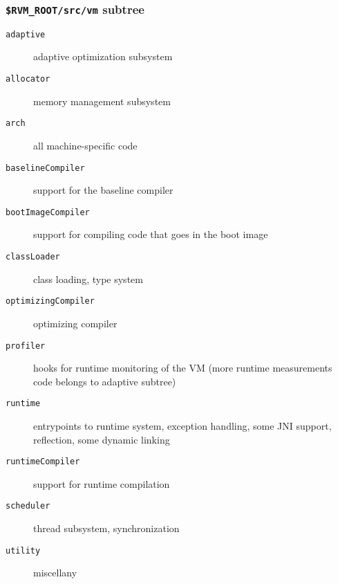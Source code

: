 \subsubsection{{\tt \$RVM\_ROOT/src/vm} subtree}

\begin{description}
\item [{\tt adaptive}] adaptive optimization subsystem
\item [{\tt allocator}] memory management subsystem
\item [{\tt arch}] all machine-specific code
\item [{\tt baselineCompiler}] support for the baseline compiler
\item [{\tt bootImageCompiler}] support for compiling code that goes in the boot image
\item [{\tt classLoader}] class loading, type system
\item [{\tt optimizingCompiler}] optimizing compiler
\item [{\tt profiler}] hooks for runtime monitoring of the VM
(more runtime measurements code belongs to adaptive subtree)
\item [{\tt runtime}] entrypoints to runtime system, exception handling, some JNI support, reflection, some dynamic linking
\item [{\tt runtimeCompiler}] support for runtime compilation
\item [{\tt scheduler}] thread subsystem, synchronization
\item [{\tt utility}] miscellany
\end{description}

